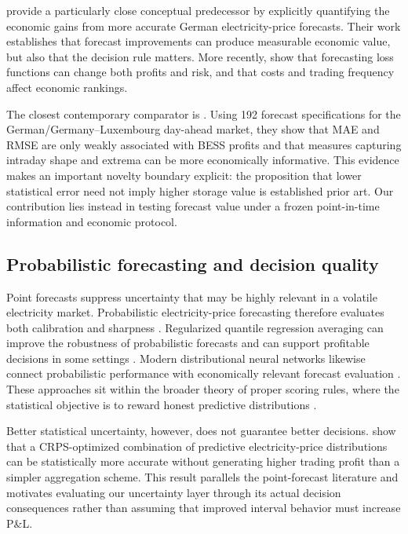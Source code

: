 \citet{kathziel2018} provide a particularly close conceptual predecessor by explicitly quantifying the economic gains from more accurate German electricity-price forecasts. Their work establishes that forecast improvements can produce measurable economic value, but also that the decision rule matters. More recently, \citet{serafin2025} show that forecasting loss functions can change both profits and risk, and that costs and trading frequency affect economic rankings.

The closest contemporary comparator is \citet{maciejowska2026}. Using 192 forecast specifications for the German/Germany--Luxembourg day-ahead market, they show that MAE and RMSE are only weakly associated with BESS profits and that measures capturing intraday shape and extrema can be more economically informative. This evidence makes an important novelty boundary explicit: the proposition that lower statistical error need not imply higher storage value is established prior art. Our contribution lies instead in testing forecast value under a frozen point-in-time information and economic protocol.

\subsection{Probabilistic forecasting and decision quality}

Point forecasts suppress uncertainty that may be highly relevant in a volatile electricity market. Probabilistic electricity-price forecasting therefore evaluates both calibration and sharpness \citep{nowotarski2018}. Regularized quantile regression averaging can improve the robustness of probabilistic forecasts and can support profitable decisions in some settings \citep{uniejewskiweron2021}. Modern distributional neural networks likewise connect probabilistic performance with economically relevant forecast evaluation \citep{marcjasz2023}. These approaches sit within the broader theory of proper scoring rules, where the statistical objective is to reward honest predictive distributions \citep{gneiting2007}.

Better statistical uncertainty, however, does not guarantee better decisions. \citet{nitka2023} show that a CRPS-optimized combination of predictive electricity-price distributions can be statistically more accurate without generating higher trading profit than a simpler aggregation scheme. This result parallels the point-forecast literature and motivates evaluating our uncertainty layer through its actual decision consequences rather than assuming that improved interval behavior must increase P\&L.

